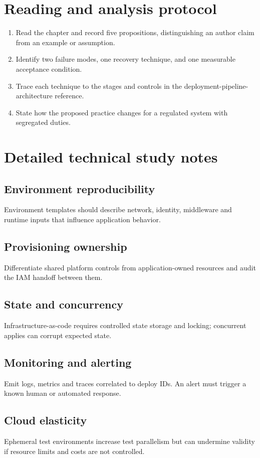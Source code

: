 \documentclass[10pt,letterpaper]{article}
\begin{document}
\section{Reading and analysis protocol}
\begin{enumerate}
\item Read the chapter and record five propositions, distinguishing an author claim from an example or assumption.
\item Identify two failure modes, one recovery technique, and one measurable acceptance condition.
\item Trace each technique to the stages and controls in the deployment-pipeline-architecture reference.
\item State how the proposed practice changes for a regulated system with segregated duties.
\end{enumerate}

\section{Detailed technical study notes}
\subsection{Environment reproducibility}
Environment templates should describe network, identity, middleware and runtime inputs that influence application behavior.

\subsection{Provisioning ownership}
Differentiate shared platform controls from application-owned resources and audit the IAM handoff between them.

\subsection{State and concurrency}
Infrastructure-as-code requires controlled state storage and locking; concurrent applies can corrupt expected state.

\subsection{Monitoring and alerting}
Emit logs, metrics and traces correlated to deploy IDs. An alert must trigger a known human or automated response.

\subsection{Cloud elasticity}
Ephemeral test environments increase test parallelism but can undermine validity if resource limits and costs are not controlled.
\end{document}
